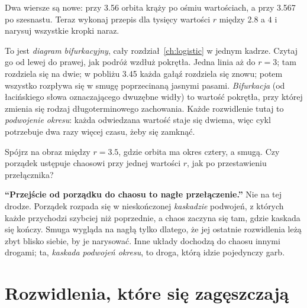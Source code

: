 
\noindent
Dwa wiersze są nowe: przy \num{3.56} orbita krąży po ośmiu wartościach, a
przy \num{3.567} po szesnastu. Teraz wykonaj przepis dla tysięcy wartości
$r$ między \num{2.8} a $4$ i narysuj wszystkie kropki naraz.


\noindent
To jest \emph{diagram bifurkacyjny}, cały rozdział~\ref{ch:logistic} w
jednym kadrze. Czytaj go od lewej do prawej, jak podróż wzdłuż pokrętła.
Jedna linia aż do $r = 3$; tam rozdziela się na dwie; w pobliżu \num{3.45}
każda gałąź rozdziela się znowu; potem wszystko rozpływa się w smugę
poprzecinaną jasnymi pasami. \emph{Bifurkacja} (od łacińskiego słowa
oznaczającego dwuzębne widły) to wartość pokrętła, przy której zmienia się
rodzaj długoterminowego zachowania. Każde rozwidlenie tutaj to
\emph{podwojenie okresu}: każda odwiedzana wartość staje się dwiema, więc
cykl potrzebuje dwa razy więcej czasu, żeby się zamknąć.

\begin{think}
Spójrz na obraz między $r = \num{3.5}$, gdzie orbita ma okres cztery, a
smugą. Czy porządek ustępuje chaosowi przy jednej wartości $r$, jak po
przestawieniu przełącznika?
\end{think}

\begin{trapbox}
\textbf{\enquote{Przejście od porządku do chaosu to nagłe przełączenie.}}
Nie na tej drodze. Porządek rozpada się w nieskończonej \emph{kaskadzie}
podwojeń, z których każde przychodzi szybciej niż poprzednie, a chaos
zaczyna się tam, gdzie kaskada się kończy. Smuga wygląda na nagłą tylko
dlatego, że jej ostatnie rozwidlenia leżą zbyt blisko siebie, by je
narysować. Inne układy dochodzą do chaosu innymi drogami; ta,
\emph{kaskada podwojeń okresu}, to droga, którą idzie pojedynczy garb.
\end{trapbox}

\section{Rozwidlenia, które się zagęszczają}
\label{sec:ch08-cascade}

